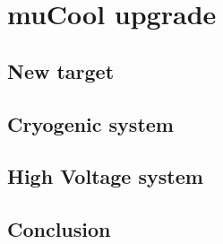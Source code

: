 \chapter{muCool upgrade}
\begin{refsection}

\section{New target}
\section{Cryogenic system}
\section{High Voltage system}
\section{Conclusion}

\cite{muCool:Taqqu:2006} \cite{muCool:Bao:2014} \cite{muCool:Andreas:2015} \cite{muCool:2018} \cite{muCool:2019} \cite{muCool:Angela:2019} \cite{muCool:2020}


\end{refsection}